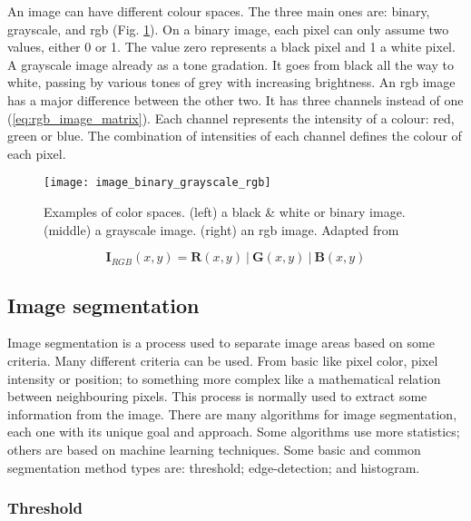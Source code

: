 An image can have different colour spaces. The three main ones are: binary, grayscale, and \gls{rgb} (Fig. \ref{fig:image_binary_grayscale_rgb}). On a binary image, each pixel can only assume two values, either 0 or 1. The value zero represents a black pixel and 1 a white pixel. A grayscale image already as a tone gradation. It goes from black all the way to white, passing by various tones of grey with increasing brightness. An \gls{rgb} image has a major difference between the other two. It has three channels instead of one (\ref{eq:rgb_image_matrix}). Each channel represents the intensity of a colour: red, green or blue. The combination of intensities of each channel defines the colour of each pixel.

\begin{figure}[htbp]
	\centering
	\texttt{[image: image\_binary\_grayscale\_rgb]}
	\caption[Examples of color spaces.]{Examples of color spaces. (left) a black \& white or binary image. (middle) a grayscale image. (right) an \gls{rgb} image. Adapted from \cite{Fonseca2017_acondicionamento_imagem}}
	\label{fig:image_binary_grayscale_rgb}
\end{figure}

\begin{equation}
\boldsymbol{I}_{RGB}(x,y) = \boldsymbol{R}(x,y) \: | \: \boldsymbol{G}(x,y) \: | \: \boldsymbol{B}(x,y)
\label{eq:rgb_image_matrix}
\end{equation}


\subsection{Image segmentation}
\label{subsec:image_segmentation}

Image segmentation is a process used to separate image areas based on some criteria. Many different criteria can be used. From basic like pixel color, pixel intensity or position; to something more complex like a mathematical relation between neighbouring pixels. This process is normally used to extract some information from the image. There are many algorithms for image segmentation, each one with its unique goal and approach. Some algorithms use more statistics; others are based on machine learning techniques. Some basic and common segmentation method types are: threshold; edge-detection; and histogram.

\subsubsection*{Threshold}
\label{subsubsec:image_segmentation_threshold}

